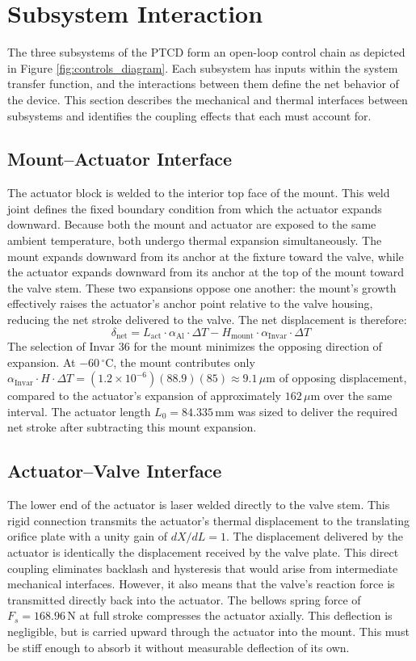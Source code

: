 \documentclass[12pt, letterpaper]{report}%
\newcounter{mycounter}           %
\newcounter{sub}[mycounter]      %
\begin{document}
    

    \section{Subsystem Interaction}
    
   
    The three subsystems of the PTCD form an open-loop control chain as depicted in Figure \ref{fig:controls_diagram}. Each subsystem has inputs within the system transfer function, and the interactions between them define the net behavior of the device. This section describes the mechanical and thermal interfaces between subsystems and identifies the coupling effects that each must account for.
    
    \subsection{Mount–Actuator Interface}
    The actuator block is welded to the interior top face of the mount. This weld joint defines the fixed boundary condition from which the actuator expands downward. Because both the mount and actuator are exposed to the same ambient temperature, both undergo thermal expansion simultaneously. The mount expands downward from its anchor at the fixture toward the valve, while the actuator expands downward from its anchor at the top of the mount toward the valve stem. 
    These two expansions oppose one another: the mount's growth effectively raises the actuator's anchor point relative to the valve housing, reducing the net stroke delivered to the valve. The net displacement is therefore:
    $$ \delta_{\text{net}} = L_{\text{act}} \cdot \alpha_{\text{Al}} \cdot \Delta T - H_{\text{mount}} \cdot \alpha_{\text{Invar}} \cdot \Delta T $$
    The selection of Invar 36 for the mount minimizes the opposing direction of expansion. At $-60\,^\circ\text{C}$, the mount contributes only $\alpha_{\text{Invar}} \cdot H \cdot \Delta T = (1.2 \times 10^{-6})(88.9)(85) \approx 9.1\,\mu\text{m}$ of opposing displacement, 
    compared to the actuator's expansion of approximately $162\,\mu\text{m}$ over the same interval. The actuator length $L_0 = 84.335\,\text{mm}$ was sized to deliver the required net stroke after subtracting this mount expansion.

    \subsection{Actuator–Valve Interface}
    The lower end of the actuator is laser welded directly to the valve stem. This rigid connection transmits the actuator's thermal displacement to the translating orifice plate with a unity gain of $dX/dL = 1$. The displacement delivered by the actuator is identically the displacement received by the valve plate. This direct coupling eliminates backlash and hysteresis that would arise from 
    intermediate mechanical interfaces. However, it also means that the valve's reaction force is transmitted directly back into the actuator. The bellows spring force of $F_s = 168.96\,\text{N}$ at full stroke compresses the 
    actuator axially. This deflection is negligible, but is carried upward through the actuator into the mount. This must be stiff enough to absorb it without measurable deflection of its own.
\end{document}
